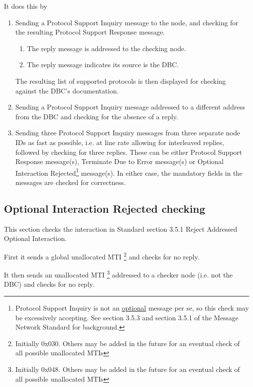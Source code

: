 It does this by 
\begin{enumerate}
\item Sending a Protocol Support Inquiry message to the node, 
and checking for the resulting Protocol Support Response message.  
    \begin{enumerate}
    \item The reply message is addressed to the checking node.
    \item The reply message indicates its source is the DBC.
    \end{enumerate}

The resulting list of supported protocols is then displayed for checking against the 
DBC's documentation.

\item Sending a Protocol Support Inquiry message addressed to a different address from the DBC
        and checking for the absence of a reply.
        
\item Sending three Protocol Support Inquiry messages from three separate node IDs
        as fast as possible, i.e. at line rate allowing for interleaved replies, 
        followed by checking for three replies.  These can be either Protocol Support 
        Response message(s), 
        Terminate Due to Error message(s)
        or Optional Interaction Rejected\footnote{
            Protocol Support Inquiry is not an \underline{optional} message per se, 
            so this check may be excessively accepting. See section 3.5.3 and
            section 3.5.1 of the Message Network Standard for background.
        }
        message(s).  In either
        case, the mandatory fields in the messages are checked for correctness.
\end{enumerate}


\subsection{Optional Interaction Rejected checking}

This section checks the interaction in Standard section 3.5.1 Reject Addressed Optional Interaction.

First it sends a global unallocated MTI
\footnote{Initially 0x030. Others may be added in the future for an eventual
    check of all possible unallocated MTIs}
and checks for no reply.

It then sends an unallocated MTI
\footnote{Initially 0x048. Others may be added in the future for an eventual
    check of all possible unallocated MTIs}
addressed to a checker node (i.e. not the DBC)
and checks for no reply.


